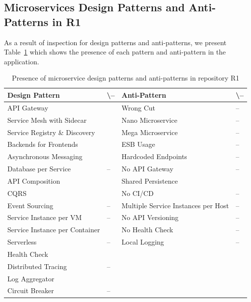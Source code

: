 \documentclass{Configuration_Files/PoliMi3i_thesis}
\newcommand{\cmark}{\ding{51}}%
\begin{document}
\subsection{Microservices Design Patterns and Anti-Patterns in R1}
\label{subsec:R1_detection}

As a result of inspection for design patterns and anti-patterns, we present Table~\ref{table:R1_result} which shows the presence of each pattern and anti-pattern in the application.

\begin{table}[H]
\centering 
    \begin{tabular}{ 
  | >{\centering\arraybackslash} m{16em} 
  | >{\centering\arraybackslash} m{2.2em} 
  | >{\centering\arraybackslash} m{16em} 
  | >{\centering\arraybackslash} m{2.2em} | }
    \hline
    \rowcolor{bluepoli!40}
    \textbf{Design Pattern} & \cmark \textbackslash – & \textbf{Anti-Pattern} & \cmark \textbackslash – \T\B \\
    \hline \hline
    API Gateway & \cmark & Wrong Cut & – \T\B\\
    \hline
    \rowcolor{bluepoli!10}
    Service Mesh with Sidecar & \cmark & Nano Microservice & – \T\B \\
    \hline
    Service Registry \& Discovery & \cmark & Mega Microservice & – \T\B \\
    \hline
    \rowcolor{bluepoli!10}
    Backends for Frontends & \cmark & ESB Usage & – \T\B \\
    \hline
    Asynchronous Messaging & \cmark & Hardcoded Endpoints & – \T\B \\
    \hline
    \rowcolor{bluepoli!10}
    Database per Service & – & No API Gateway & – \T\B \\
    \hline
    API Composition & \cmark & Shared Persistence & \cmark \T\B \\
    \hline
    \rowcolor{bluepoli!10}
    CQRS & \cmark & No CI/CD & – \T\B \\
    \hline
    Event Sourcing & – & Multiple Service Instances per Host & – \T\B \\
    \hline
    \rowcolor{bluepoli!10}
    Service Instance per VM & – & No API Versioning & – \T\B \\
    \hline
    Service Instance per Container & \cmark & No Health Check & – \T\B \\
    \hline
    \rowcolor{bluepoli!10}
    Serverless & – & Local Logging & – \T\B \\
    \hline
    Health Check & \cmark &  & \T\B \\
    \hline
    \rowcolor{bluepoli!10}
    Distributed Tracing & – & & \T\B \\
    \hline
    Log Aggregator & \cmark &  & \T\B \\
    \hline
    \rowcolor{bluepoli!10}
    Circuit Breaker & – &  & \T\B \\
    \hline
    \end{tabular}
    \\[10pt]
    \caption{Presence of microservice design patterns and anti-patterns in repository R1}
    \label{table:R1_result}
\end{table}
\end{document}
